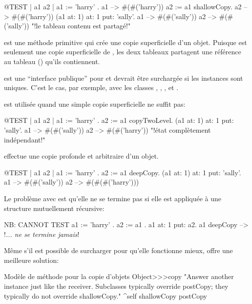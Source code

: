 \documentclass[a4paper,10pt,twoside]{book}
\begin{document}
\begin{code}{@TEST | a1 a2 |}
a1 := { { 'harry' } }.
a1 --> #(#('harry'))
a2 := a1 shallowCopy.
a2 --> #(#('harry'))
(a1 at: 1) at: 1 put: 'sally'.
a1 --> #(#('sally'))
a2 --> #(#('sally'))    "!le tableau contenu est partag\'e!"
\end{code}

 est une m\'ethode primitive qui cr\'ee une copie superficielle d'un objet. Puisque  est seulement une copie superficielle de , les deux tableaux partagent une r\'ef\'erence au tableau () qu'ils contiennent.

 est une ``interface publique'' pour  et devrait \^etre surcharg\'ee si les instances sont uniques. C'est le cas, par exemple, avec les classes , , ,  et .

 est utilis\'ee quand une simple copie superficielle ne suffit pas:

\begin{code}{@TEST | a1 a2 |}
a1 := { { 'harry' } } .
a2 := a1 copyTwoLevel.
(a1 at: 1) at: 1 put: 'sally'.
a1 --> #(#('sally'))
a2 --> #(#('harry'))    "!\'etat compl\`etement ind\'ependant!"
\end{code}

 effectue une copie profonde et arbitraire d'un objet.

\begin{code}{@TEST | a1 a2 |}
a1 := { { { 'harry' } } } .
a2 := a1 deepCopy.
(a1 at: 1) at: 1 put: 'sally'.
a1 --> #(#('sally'))
a2 --> #(#(#('harry')))
\end{code}

Le probl\`eme avec  est qu'elle ne se termine pas si elle est appliqu\'ee \`a une structure mutuellement r\'ecursive:

\begin{code}{NB: CANNOT TEST}
a1 := { 'harry' }.
a2 := { a1 }.
a1 at: 1 put: a2.
a1 deepCopy --> !\emph{... ne se termine jamais}!
\end{code}

M\^eme s'il est possible de surcharger  pour qu'elle fonctionne mieux,  offre une meilleure solution:

\begin{method}{Mod\`ele de m\'ethode pour la copie d'objets}
Object>>>copy
    "Answer another instance just like the receiver. Subclasses typically override postCopy;
    they typically do not override shallowCopy."
    ^self shallowCopy postCopy
\end{method}
\end{document}
